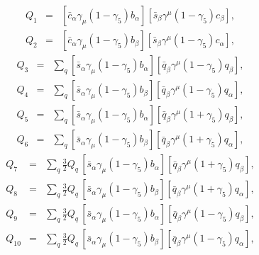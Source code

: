 \documentclass[preprint,superscriptaddress,nofootinbib]{revtex4}
\begin{document}
    \begin{eqnarray}
    Q_{1} &=&
  [ \bar{c}_{\alpha}{\gamma}_{\mu}(1-{\gamma}_{5})b_{\alpha} ]
  [ \bar{s}_{\beta} {\gamma}^{\mu}(1-{\gamma}_{5})c_{\beta} ]
    \label{q1}, \\
    Q_{2} &=&
  [ \bar{c}_{\alpha}{\gamma}_{\mu}(1-{\gamma}_{5})b_{\beta} ]
  [ \bar{s}_{\beta}{\gamma}^{\mu}(1-{\gamma}_{5})c_{\alpha} ]
    \label{q2},
    \end{eqnarray}
    \begin{eqnarray}
    Q_{3} &=& \sum\limits_{q}
  [ \bar{s}_{\alpha}{\gamma}_{\mu}(1-{\gamma}_{5})b_{\alpha} ]
  [ \bar{q}_{\beta} {\gamma}^{\mu}(1-{\gamma}_{5})q_{\beta} ]
    \label{q3}, \\
    Q_{4} &=& \sum\limits_{q}
  [ \bar{s}_{\alpha}{\gamma}_{\mu}(1-{\gamma}_{5})b_{\beta} ]
  [ \bar{q}_{\beta}{\gamma}^{\mu}(1-{\gamma}_{5})q_{\alpha} ]
    \label{q4}, \\
    Q_{5} &=& \sum\limits_{q}
  [ \bar{s}_{\alpha}{\gamma}_{\mu}(1-{\gamma}_{5})b_{\alpha} ]
  [ \bar{q}_{\beta} {\gamma}^{\mu}(1+{\gamma}_{5})q_{\beta} ]
    \label{q5}, \\
    Q_{6} &=& \sum\limits_{q}
  [ \bar{s}_{\alpha}{\gamma}_{\mu}(1-{\gamma}_{5})b_{\beta} ]
  [ \bar{q}_{\beta}{\gamma}^{\mu}(1+{\gamma}_{5})q_{\alpha} ]
    \label{q6},
    \end{eqnarray}
    \begin{eqnarray}
    Q_{7} &=& \sum\limits_{q} \frac{3}{2}Q_{q}\,
  [ \bar{s}_{\alpha}{\gamma}_{\mu}(1-{\gamma}_{5})b_{\alpha} ]
  [ \bar{q}_{\beta} {\gamma}^{\mu}(1+{\gamma}_{5})q_{\beta} ]
    \label{q7}, \\
    Q_{8} &=& \sum\limits_{q} \frac{3}{2}Q_{q}\,
  [ \bar{s}_{\alpha}{\gamma}_{\mu}(1-{\gamma}_{5})b_{\beta} ]
  [ \bar{q}_{\beta}{\gamma}^{\mu}(1+{\gamma}_{5})q_{\alpha} ]
    \label{q8}, \\
    Q_{9} &=& \sum\limits_{q} \frac{3}{2}Q_{q}\,
  [ \bar{s}_{\alpha}{\gamma}_{\mu}(1-{\gamma}_{5})b_{\alpha} ]
  [ \bar{q}_{\beta} {\gamma}^{\mu}(1-{\gamma}_{5})q_{\beta} ]
    \label{q9}, \\
    Q_{10} &=& \sum\limits_{q} \frac{3}{2}Q_{q}\,
  [ \bar{s}_{\alpha}{\gamma}_{\mu}(1-{\gamma}_{5})b_{\beta} ]
  [ \bar{q}_{\beta}{\gamma}^{\mu}(1-{\gamma}_{5})q_{\alpha} ]
    \label{q10},
    \end{eqnarray}
\end{document}
